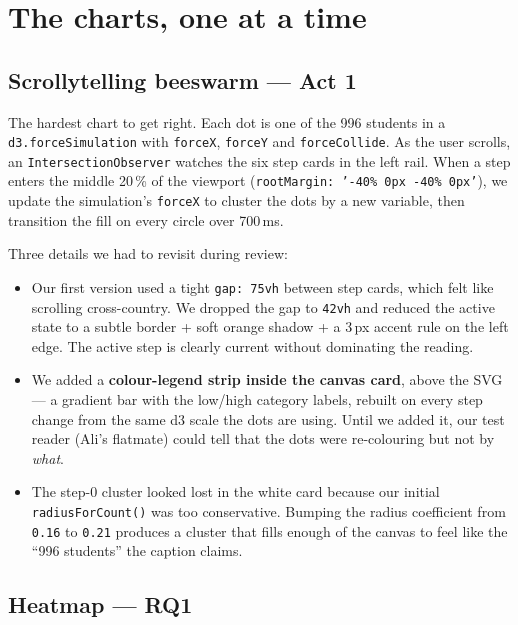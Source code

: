 \documentclass[11pt,a4paper]{article}
\newcommand{\code}[1]{\texttt{\small #1}}
\begin{document}
\section{The charts, one at a time}
\label{sec:charts}

\subsection{Scrollytelling beeswarm — Act 1}

The hardest chart to get right. Each dot is one of the 996 students in a \code{d3.forceSimulation} with \code{forceX}, \code{forceY} and \code{forceCollide}. As the user scrolls, an \code{IntersectionObserver} watches the six step cards in the left rail. When a step enters the middle 20\,\% of the viewport (\code{rootMargin: '-40\% 0px -40\% 0px'}), we update the simulation's \code{forceX} to cluster the dots by a new variable, then transition the fill on every circle over 700\,ms.

Three details we had to revisit during review:

\begin{itemize}
  \item Our first version used a tight \code{gap: 75vh} between step cards, which felt like scrolling cross-country. We dropped the gap to \code{42vh} and reduced the active state to a subtle border + soft orange shadow + a 3\,px accent rule on the left edge. The active step is clearly current without dominating the reading.
  \item We added a \textbf{colour-legend strip inside the canvas card}, above the SVG — a gradient bar with the low/high category labels, rebuilt on every step change from the same d3 scale the dots are using. Until we added it, our test reader (Ali's flatmate) could tell that the dots were re-colouring but not by \emph{what}.
  \item The step-0 cluster looked lost in the white card because our initial \code{radiusForCount()} was too conservative. Bumping the radius coefficient from \code{0.16} to \code{0.21} produces a cluster that fills enough of the canvas to feel like the ``996 students'' the caption claims.
\end{itemize}

\subsection{Heatmap — RQ1}
\end{document}
